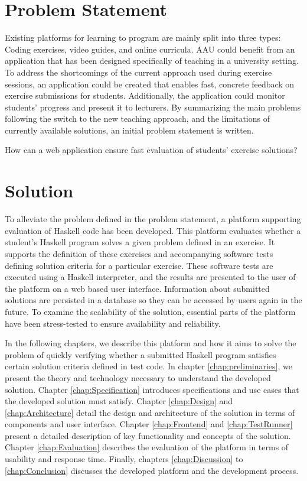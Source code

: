 \section{Problem Statement}
Existing platforms for learning to program are mainly split into three types: Coding exercises, video guides, and online curricula.
AAU could benefit from an application that has been designed specifically of teaching in a university setting.
To address the shortcomings of the current approach used during exercise sessions, an application could be created that enables fast, concrete feedback on exercise submissions for students. Additionally, the application could monitor students' progress and present it to lecturers.
By summarizing the main problems following the switch to the new teaching approach, and the limitations of currently available solutions, an initial problem statement is written.
\begin{displayquote}
    How can a web application ensure fast evaluation of students' exercise solutions?
\end{displayquote}

\section{Solution}
To alleviate the problem defined in the problem statement, a platform supporting evaluation of Haskell code has been developed. This platform evaluates whether a student's Haskell program solves a given problem defined in an exercise. It supports the definition of these exercises and accompanying software tests defining solution criteria for a particular exercise. These software tests are executed using a Haskell interpreter, and the results are presented to the user of the platform on a web based user interface.
Information about submitted solutions are persisted in a database so they can be accessed by users again in the future.
To examine the scalability of the solution, essential parts of the platform have been stress-tested to ensure availability and reliability.

In the following chapters, we describe this platform and how it aims to solve the problem of quickly verifying whether a submitted Haskell program satisfies certain solution criteria defined in test code.
In chapter \ref{chap:preliminaries}, we present the theory and technology necessary to understand the developed solution.
Chapter \ref{chap:Specification} introduces specifications and use cases that the developed solution must satisfy.
Chapter \ref{chap:Design} and \ref{chap:Architecture} detail the design and architecture of the solution in terms of components and user interface.
Chapter \ref{chap:Frontend} and \ref{chap:TestRunner} present a detailed description of key functionality and concepts of the solution.
Chapter \ref{chap:Evaluation} describes the evaluation of the platform in terms of usability and response time.
Finally, chapters \ref{chap:Discussion} to \ref{chap:Conclusion} discusses the developed platform and the development process.
